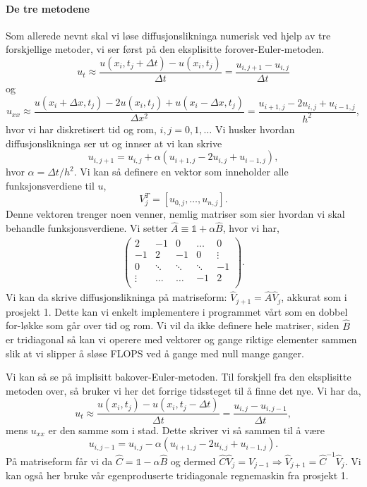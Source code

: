 \documentclass[norsk, 10pt]{article}
\def\para#1{\left( #1 \right)}
\begin{document}
\paragraph{De tre metodene}
Som allerede nevnt skal vi løse diffusjonslikninga numerisk ved hjelp av tre forskjellige metoder, vi ser først på den eksplisitte forover-Euler-metoden. 
 \[
u_t\approx \frac{u(x_i,t_j+\Delta t)-u(x_i,t_j)}{\Delta t} = \frac{u_{i,j+1}-u_{i,j}}{\Delta t}
\]
og
\[
u_{xx}\approx \frac{u(x_i+\Delta x,t_j)-2u(x_i,t_j)+u(x_i-\Delta x,t_j)}{\Delta x^2} = \frac{u_{i+1,j}-2u_{i,j}+u_{i-1,j}}{h^2},
\]
hvor vi har diskretisert tid og rom, $i,j = 0,1,\ldots$ Vi husker hvordan diffusjonslikninga ser ut og innser at vi kan skrive
$$ u_{i,j+1} = u_{i,j} + \alpha\para{u_{i+1,j}-2u_{i,j}+u_{i-1,j}}, $$
hvor $\alpha = \Delta t /h^2$. Vi kan så definere en vektor som inneholder alle funksjonsverdiene til $u$,
$$ V_j^T = [u_{0,j},\ldots,u_{n,j}]. $$
Denne vektoren trenger noen venner, nemlig matriser som sier hvordan vi skal behandle funksjonsverdiene. Vi setter $\hat A \equiv \mathbb 1 + \alpha \hat B$, hvor vi har,
\begin{align}\para{\begin{matrix}
2 & -1 & 0 & \ldots & 0 \\
-1 & 2 & -1 & 0& \vdots \\
0 & \ddots & \ddots & \ddots & -1 \\
\vdots & \ldots & \ldots & -1 & 2 \\
\end{matrix}}.
\end{align}
Vi kan da skrive diffusjonslikninga på matriseform: $\hat V_{j+1} = \hat A \hat V_j$, akkurat som i prosjekt 1. Dette kan vi enkelt implementere i programmet vårt som en dobbel for-løkke som går over tid og rom. Vi vil da ikke definere hele matriser, siden $\hat B$ er tridiagonal så kan vi operere med vektorer og gange riktige elementer sammen slik at vi slipper å sløse FLOPS ved å gange med null mange ganger.

Vi kan så se på implisitt bakover-Euler-metoden. Til forskjell fra den eksplisitte metoden over, så bruker vi her det forrige tidssteget til å finne det nye. Vi har da,
 \[
u_t\approx \frac{u(x_i,t_j)-u(x_i,t_j-\Delta t)}{\Delta t} = \frac{u_{i,j}-u_{i,j-1}}{\Delta t},
\]
mens $u_{xx}$ er den samme som i stad. Dette skriver vi så sammen til å være
$$ u_{i,j-1} = u_{i,j} - \alpha\para{u_{i+1,j}-2u_{i,j}+u_{i-1,j}}. $$
På matriseform får vi da $\hat C = \mathbb 1 - \alpha \hat B$ og dermed $\hat C \hat V_j = V_{j-1} \Rightarrow \hat V_{j+1} = \hat C^{-1}\hat V_{j}$. Vi kan også her bruke vår egenproduserte tridiagonale regnemaskin fra prosjekt 1.
\end{document}
